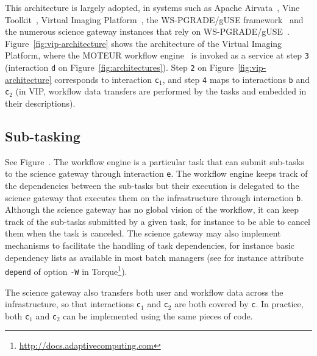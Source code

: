 \documentclass[preprint,3p,twocolumn]{elsarticle}
\begin{document}
This architecture is largely adopted, in systems such as Apache
Airvata~\cite{marru2011apache}, Vine
Toolkit~\cite{DBLP:journals/scpe/SzejnfeldDKKKKLPTWDNW10}, Virtual
Imaging Platform~\cite{GLAT-13}, the WS-PGRADE/gUSE
framework~\cite{Kacsuk2012} and the numerous science gateway instances
that rely on
WS-PGRADE/gUSE~\cite{kacsuk2014science}. Figure~\ref{fig:vip-architecture}
shows the architecture of the Virtual Imaging Platform, where the
MOTEUR workflow engine~\cite{GLAT-08i} is invoked as a service at step
\texttt{3} (interaction \texttt{d} on
Figure~\ref{fig:architectures}). Step \texttt{2} on
Figure~\ref{fig:vip-architecture} corresponds to interaction
\texttt{c$_1$}, and step \texttt{4} maps to interactions \texttt{b}
and \texttt{c$_2$} (in VIP, workflow data transfers are performed by
the tasks and embedded in their descriptions).

\subsection{Sub-tasking}

See Figure~. The workflow engine is a particular
task that can submit sub-tasks to the science gateway through
interaction \texttt{e}. The workflow engine keeps track of the
dependencies between the sub-tasks but their execution is delegated to
the science gateway that executes them on the infrastructure through
interaction \texttt{b}. Although the science gateway has no global
vision of the workflow, it can keep track of the sub-tasks submitted
by a given task, for instance to be able to cancel them when the task
is canceled. The science gateway may also implement mechanisms to
facilitate the handling of task dependencies, for instance basic
dependency lists as available in most batch managers (see for instance
attribute \texttt{depend} of option \texttt{-W} in
Torque\footnote{\url{http://docs.adaptivecomputing.com}}).

The science gateway also transfers both user and workflow data across
the infrastructure, so that interactions \texttt{c$_1$} and
\texttt{c$_2$} are both covered by \texttt{c}. In practice, both
\texttt{c$_1$} and \texttt{c$_2$} can be implemented using the same
pieces of code.
\end{document}
